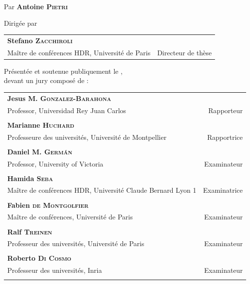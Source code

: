 \begin{titlingpage}
\begin{SingleSpace}
\begin{center}
{\LARGE Par } {\LARGE\textbf{Antoine \textsc{Pietri}}}\\

\vspace{5mm}

{\large Dirigée par }\\

\vspace{3mm}

\begin{tabular}{lr}
  \textbf{Stefano {\scshape Zacchiroli}} & \\
  Maître de conférences HDR, Université de Paris \hspace{25mm} &
  Directeur de thèse \\
\end{tabular}

\vspace{4mm}

{\large Présentée et soutenue publiquement le , \\
 devant un jury composé de :}\\

\vspace{4mm}

\begin{tabular}{lr}
  \textbf{Jesus M. {\scshape Gonzalez-Barahona}} & \\
  Professor, Universidad Rey Juan Carlos \hspace{45mm}
  & Rapporteur \\
  & \\
  \textbf{Marianne {\scshape Huchard}} & \\
  Professeure des universités, Université de Montpellier
  & Rapportrice \\
  & \\
  \textbf{Daniel M. {\scshape Germán}} & \\
  Professor, University of Victoria
  & Examinateur \\
  & \\
  \textbf{Hamida {\scshape Seba}} & \\
  Maître de conférences HDR, Université Claude Bernard Lyon 1
  & Examinatrice \\
  & \\
  \textbf{Fabien {\scshape de Montgolfier}} & \\
  Maître de conférences, Université de Paris
  & Examinateur \\
  & \\
  \textbf{Ralf {\scshape Treinen}} & \\
  Professeur des universités, Université de Paris
  & Examinateur \\
  & \\
  \textbf{Roberto {\scshape Di Cosmo}} & \\
  Professeur des universités, Inria
  & Examinateur \\
  & \\
\end{tabular}


\end{center}
\end{SingleSpace}
\end{titlingpage}
